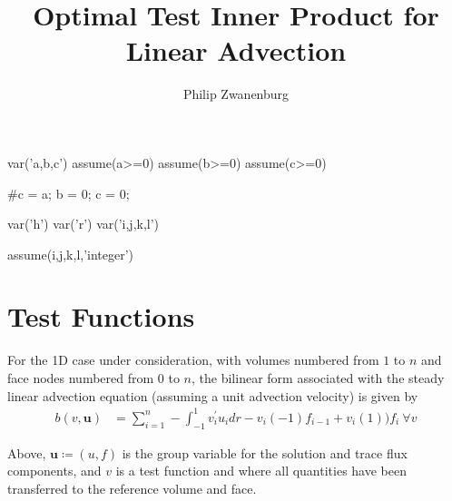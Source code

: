 \documentclass{article}
\title{Optimal Test Inner Product for Linear Advection}
\author{Philip Zwanenburg}
\numberwithin{equation}{section}
\newcommand{\varg}[1]{\mathit{\bm{{#1}}}} %
\newcommand{\jump}[1]{{\llbracket #1\rrbracket}}
\begin{document}
\maketitle


\begin{sagesilent}
var('a,b,c')
assume(a>=0)
assume(b>=0)
assume(c>=0)

#c = a;
b = 0; c = 0;
\end{sagesilent}


\begin{sagesilent}
var('h')
var('r')
var('i,j,k,l')

assume(i,j,k,l,'integer')
\end{sagesilent}

\section{Test Functions}

For the 1D case under consideration, with volumes numbered from $1$ to $n$ and face nodes numbered from $0$ to $n$, the
bilinear form associated with the steady linear advection equation (assuming a unit advection velocity) is given by
\begin{align} \label{eq:bilinear_adv}
b(v,\varg{u}) 
& = \sum_{i=1}^n -\int_{-1}^{1} v_i^{'} u_i dr - v_i(-1)f_{i-1}+v_{i}(1))f_i\ \forall v
\end{align}

Above, $\varg{u} \coloneqq (u,f)$ is the group variable for the solution and trace flux components, and $v$ is a test
function and where all quantities have been transferred to the reference volume and face.
\\~
\end{document}
